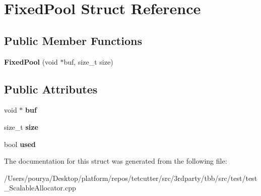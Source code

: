 \hypertarget{structFixedPool}{}\section{Fixed\+Pool Struct Reference}
\label{structFixedPool}
\subsection*{Public Member Functions}
\begin{DoxyCompactItemize}
\item 
\hypertarget{structFixedPool_ad252a0f1a7216cd6f557a7aa4ce2e1dc}{}{\bfseries Fixed\+Pool} (void $\ast$buf, size\+\_\+t size)\label{structFixedPool_ad252a0f1a7216cd6f557a7aa4ce2e1dc}

\end{DoxyCompactItemize}
\subsection*{Public Attributes}
\begin{DoxyCompactItemize}
\item 
\hypertarget{structFixedPool_a8ad5a7bd564801166e66d88b183156e6}{}void $\ast$ {\bfseries buf}\label{structFixedPool_a8ad5a7bd564801166e66d88b183156e6}

\item 
\hypertarget{structFixedPool_a6b5fd8997fc1b0ad45c58bfd058726ca}{}size\+\_\+t {\bfseries size}\label{structFixedPool_a6b5fd8997fc1b0ad45c58bfd058726ca}

\item 
\hypertarget{structFixedPool_afe11f799c6b9df366ef4c8500005fa3a}{}bool {\bfseries used}\label{structFixedPool_afe11f799c6b9df366ef4c8500005fa3a}

\end{DoxyCompactItemize}


The documentation for this struct was generated from the following file\+:\begin{DoxyCompactItemize}
\item 
/\+Users/pourya/\+Desktop/platform/repos/tetcutter/src/3rdparty/tbb/src/test/test\+\_\+\+Scalable\+Allocator.\+cpp\end{DoxyCompactItemize}
